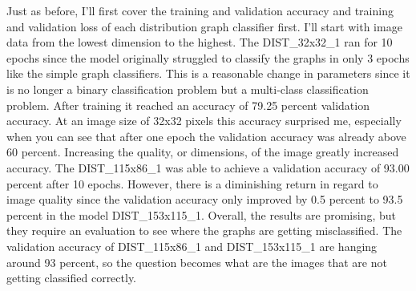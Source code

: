 \documentclass[12pt]{article}
\begin{document}
       
            Just as before, I’ll first cover the training and validation accuracy 
            and training and validation loss of each distribution graph classifier first. 
            I’ll start with image data from the lowest dimension to the highest. 
            The DIST\_32x32\_1 ran for 10 epochs since the model originally struggled to classify the graphs in only 3 epochs 
            like the simple graph classifiers. This is a reasonable change in parameters 
            since it is no longer a binary classification problem but a multi-class classification problem. 
            After training it reached an accuracy of 79.25 percent validation accuracy. 
            At an image size of 32x32 pixels this accuracy surprised me, 
            especially when you can see that after one epoch the validation accuracy was already above 60 percent. 
            Increasing the quality, or dimensions, of the image greatly increased accuracy. 
            The DIST\_115x86\_1 was able to achieve a validation accuracy of 93.00 percent after 10 epochs. 
            However, there is a diminishing return in regard to image quality 
            since the validation accuracy only improved by 0.5 percent to 93.5 percent in the model DIST\_153x115\_1. 
            Overall, the results are promising, but they require an evaluation to see where the graphs are getting misclassified. 
            The validation accuracy of DIST\_115x86\_1 and DIST\_153x115\_1 are hanging around 93 percent, 
            so the question becomes what are the images that are not getting classified correctly. 
            
\end{document}
